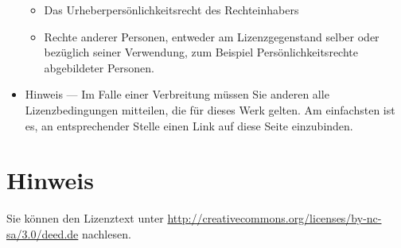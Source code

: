 \begin{small}
\begin{itemize}
\begin{itemize}
\item Das Urheberpersönlichkeitsrecht des Rechteinhabers

\item Rechte anderer Personen, entweder am Lizenzgegenstand selber oder
bezüglich seiner Verwendung, zum Beispiel Persönlichkeitsrechte abgebildeter 
Personen.
\end{itemize}

\item Hinweis — Im Falle einer Verbreitung müssen Sie anderen alle
Lizenzbedingungen mitteilen, die für dieses Werk gelten. Am einfachsten ist es,
an entsprechender Stelle einen Link auf diese Seite einzubinden.
\end{itemize}

\section*{Hinweis}
Sie können den Lizenztext unter
\url{http://creativecommons.org/licenses/by-nc-sa/3.0/deed.de} nachlesen.
\end{small}